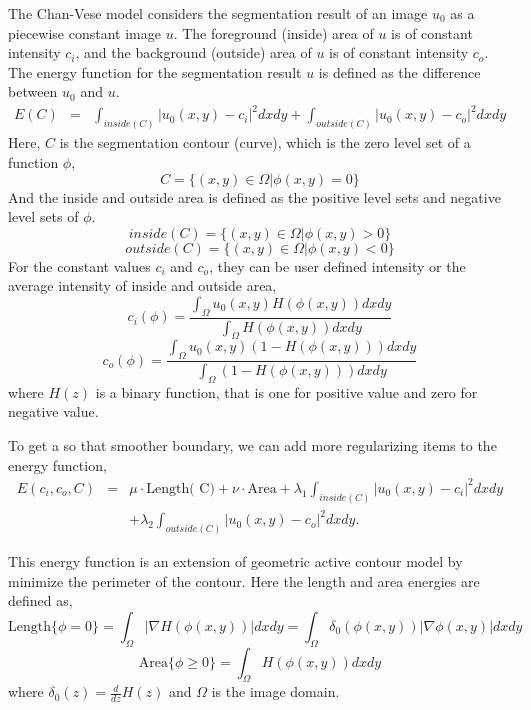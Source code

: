 The Chan-Vese model considers the segmentation result of an image $u_0$  as a piecewise constant image $u$. The foreground (inside) area of $u$ is of constant intensity $c_i$, and the background (outside) area of $u$ is of constant intensity $c_o$. The energy function for the segmentation result $u$ is defined as the difference between $u_0$ and $u$.
\begin{eqnarray*}
E(C) & = &  \int_{inside( C)}|u_0(x,y) - c_i|^2dxdy + \int_{outside( C)}|u_0(x,y) - c_o|^2dxdy
\end{eqnarray*}
Here, $C$ is the segmentation contour (curve), which is the zero level set of a function $\phi$,
\begin{equation}
C = \{(x,y) \in \Omega|\phi(x,y) = 0\}
\end{equation}
And the inside and outside area is defined as the positive level sets and negative level sets of $\phi$.
\begin{equation}
inside( C) = \{(x,y) \in \Omega|\phi(x,y) > 0\}
\end{equation}
\begin{equation}
outside( C) = \{(x,y) \in \Omega|\phi(x,y) < 0\}
\end{equation}
For the constant values $c_i$ and $c_o$,  they can be user defined intensity or the average intensity of inside and outside area,
\begin{equation}
c_i(\phi) = \frac{\int_{\Omega}u_0(x,y)H(\phi(x,y))dxdy}{\int_{\Omega}H(\phi(x,y))dxdy}
\end{equation}
\begin{equation}
c_o(\phi) = \frac{\int_{\Omega}u_0(x,y)(1-H(\phi(x,y)))dxdy}{\int_{\Omega}(1-H(\phi(x,y)))dxdy}
\end{equation}
where $H(z)$ is a binary function, that is one for positive value and zero for negative value.

To get a so that smoother boundary, we can add more regularizing items to the energy function,
\begin{eqnarray}
\label{eqn:chanvese}
E(c_i,c_o,C) & = & \mu\cdot\mbox{Length( C)} + \nu \cdot \mbox{Area} + \lambda_1\int_{inside( C)}|u_0(x,y) - c_i|^2dxdy \\
\nonumber
& & + \lambda_2\int_{outside( C)}|u_0(x,y) - c_o|^2dxdy.
\end{eqnarray}

This energy function is an extension of geometric active contour model by minimize the perimeter of the contour. Here the length and area energies are defined as, 
\begin{equation}
\mbox{Length}\{\phi = 0\} = \int_\Omega|\nabla H(\phi(x,y))|dxdy = \int_{\Omega}\delta_0(\phi(x,y))|\nabla\phi(x,y)|dxdy
\end{equation}
\begin{equation}
\mbox{Area}\{\phi \ge 0\} = \int_{\Omega}H(\phi(x,y))dxdy
\end{equation}
where $\delta_0(z) = \frac{d}{dz}H(z)$ and $\Omega$ is the image domain.

